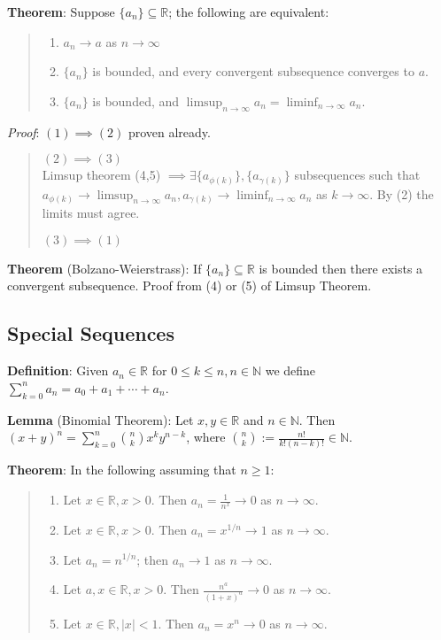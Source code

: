 \documentclass[11pt]{article}
\begin{document}
\textbf{Theorem}: Suppose $\{a_n\} \subseteq \mathbb{R}$; the following are equivalent:
\begin{quote}\vspace{-0.3cm}
	\begin{enumerate}
	\item $a_n \to a$ as $n \to \infty$
	\item $\{a_n\}$ is bounded, and every convergent subsequence converges to $a$.
	\item $\{a_n\}$ is bounded, and $\limsup_{n \to \infty} a_n = \liminf_{n \to \infty} a_n$.
	\end{enumerate}
\end{quote}
\emph{Proof}: $(1) \implies (2)$ proven already.
\begin{quote}\vspace{-0.3cm}
$(2) \implies (3)$\\
Limsup theorem (4,5) $\implies \exists \{a_{\phi(k)}\}, \{a_{\gamma(k)}\}$ subsequences such that $a_{\phi(k)} \to \limsup_{n \to \infty} a_n, a_{\gamma(k)} \to \liminf_{n \to \infty} a_n$ as $k \to \infty$. By (2) the limits must agree.

$(3) \implies (1)$\\

\end{quote}

\textbf{Theorem} (Bolzano-Weierstrass): If $\{a_n\} \subseteq \mathbb{R}$ is bounded then there exists a convergent subsequence. Proof from (4) or (5) of Limsup Theorem.

\subsection{Special Sequences}

\textbf{Definition}: Given $a_n \in \mathbb{R}$ for $0 \leq k \leq n, n \in \mathbb{N}$ we define $\sum_{k=0}^n a_n = a_0 + a_1 + \cdots + a_n$.

\textbf{Lemma} (Binomial Theorem): Let $x,y \in \mathbb{R}$ and $n \in \mathbb{N}$. Then $(x+y)^n = \sum\limits_{k=0}^n {n \choose k} x^k y^{n-k}$, where ${n \choose k} := \frac{n!}{k!(n-k)!} \in \mathbb{N}$.

\textbf{Theorem}: In the following assuming that $n \geq 1$:
\begin{quote}\vspace{-0.3cm}
	\begin{enumerate}
	\item Let $x \in \mathbb{R}, x > 0$. Then $a_n = \frac{1}{n^x} \to 0$ as $n \to \infty$.
	\item Let $x \in \mathbb{R}, x > 0$. Then $a_n = x^{1/n} \to 1$ as $n \to \infty$.
	\item Let $a_n = n^{1/n}$; then $a_n \to 1$ as $n \to \infty$.
	\item Let $a,x \in \mathbb{R}, x > 0$. Then $\frac{n^a}{(1+x)^a} \to 0$ as $n \to \infty$.
	\item Let $x \in \mathbb{R}, |x| < 1$. Then $a_n = x^n \to 0$ as $n \to \infty$.
	\end{enumerate}
\end{quote}
\end{document}
